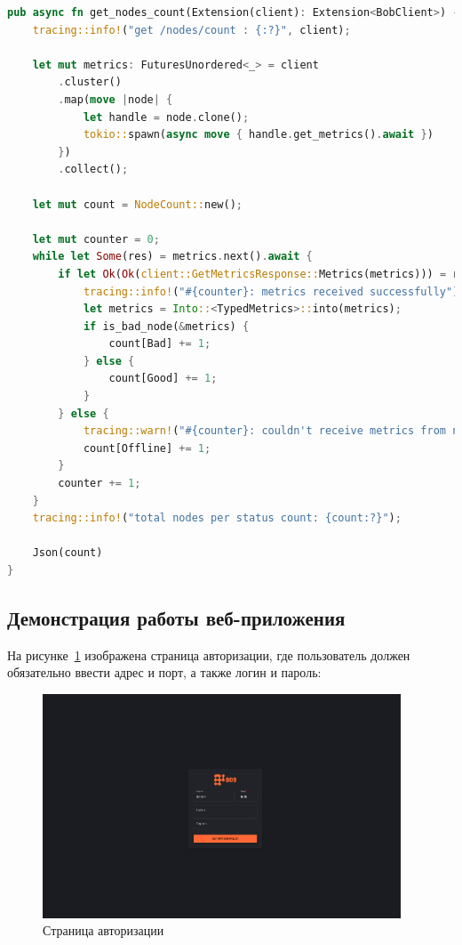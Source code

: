 \begin{lstlisting}[label=lst:method, caption={Метод публичного API}, language=Rust]
pub async fn get_nodes_count(Extension(client): Extension<BobClient>) -> Json<NodeCount> {
    tracing::info!("get /nodes/count : {:?}", client);

    let mut metrics: FuturesUnordered<_> = client
        .cluster()
        .map(move |node| {
            let handle = node.clone();
            tokio::spawn(async move { handle.get_metrics().await })
        })
        .collect();

    let mut count = NodeCount::new();

    let mut counter = 0;
    while let Some(res) = metrics.next().await {
        if let Ok(Ok(client::GetMetricsResponse::Metrics(metrics))) = res {
            tracing::info!("#{counter}: metrics received successfully");
            let metrics = Into::<TypedMetrics>::into(metrics);
            if is_bad_node(&metrics) {
                count[Bad] += 1;
            } else {
                count[Good] += 1;
            }
        } else {
            tracing::warn!("#{counter}: couldn't receive metrics from node");
            count[Offline] += 1;
        }
        counter += 1;
    }
    tracing::info!("total nodes per status count: {count:?}");

    Json(count)
}
\end{lstlisting}

\subsection{Демонстрация работы веб-приложения}

На рисунке~\ref{fig:auth} изображена страница авторизации, где пользователь должен обязательно ввести адрес и порт, а также логин и пароль:

\begin{figure}[!htbp]
  \begin{center}
    \includegraphics[width=0.95\textwidth]{inc/auth.png}
  \end{center}
  \caption{Страница авторизации}\label{fig:auth}
\end{figure}

